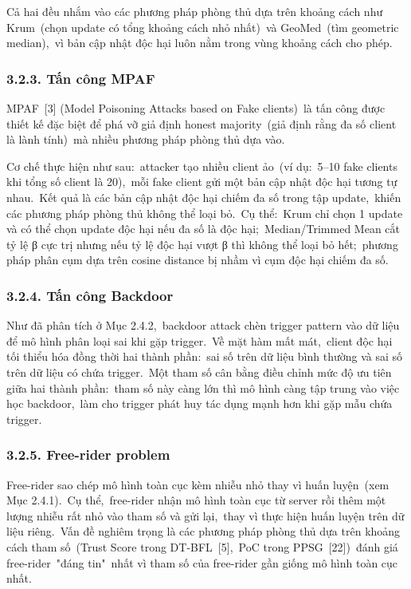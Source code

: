 Cả hai đều nhắm vào các phương pháp phòng thủ dựa trên khoảng cách như Krum~(chọn update có tổng khoảng cách nhỏ nhất)~và GeoMed~(tìm geometric median),~vì bản cập nhật độc hại luôn nằm trong vùng khoảng cách cho phép.

\subsubsection{3.2.3. Tấn công MPAF}\label{tux1ea5n-cuxf4ng-mpaf}

MPAF~{[}3{]} (Model Poisoning Attacks based on Fake clients)~là tấn công được thiết kế đặc biệt để phá vỡ giả định honest majority~(giả định rằng đa số client là lành tính)~mà nhiều phương pháp phòng thủ dựa vào.

Cơ chế thực hiện như sau:~attacker tạo nhiều client ảo~(ví dụ:~5--10 fake clients khi tổng số client là 20),~mỗi fake client gửi một bản cập nhật độc hại tương tự nhau.~Kết quả là các bản cập nhật độc hại chiếm đa số trong tập update,~khiến các phương pháp phòng thủ không thể loại bỏ.~Cụ thể:~Krum chỉ chọn 1 update và có thể chọn update độc hại nếu đa số là độc hại;~Median/Trimmed Mean cắt tỷ lệ β cực trị nhưng nếu tỷ lệ độc hại vượt β thì không thể loại bỏ hết;~phương pháp phân cụm dựa trên cosine distance bị nhầm vì cụm độc hại chiếm đa số.

\subsubsection{3.2.4. Tấn công Backdoor}\label{tux1ea5n-cuxf4ng-backdoor}

Như đã phân tích ở Mục 2.4.2,~backdoor attack chèn trigger pattern vào dữ liệu để mô hình phân loại sai khi gặp trigger.~Về mặt hàm mất mát,~client độc hại tối thiểu hóa đồng thời hai thành phần:~sai số trên dữ liệu bình thường và sai số trên dữ liệu có chứa trigger.~Một tham số cân bằng điều chỉnh mức độ ưu tiên giữa hai thành phần:~tham số này càng lớn thì mô hình càng tập trung vào việc học backdoor,~làm cho trigger phát huy tác dụng mạnh hơn khi gặp mẫu chứa trigger.

\subsubsection{3.2.5. Free-rider problem}\label{free-rider-problem}

Free-rider sao chép mô hình toàn cục kèm nhiễu nhỏ thay vì huấn luyện~(xem Mục 2.4.1).~Cụ thể,~free-rider nhận mô hình toàn cục từ server rồi thêm một lượng nhiễu rất nhỏ vào tham số và gửi lại,~thay vì thực hiện huấn luyện trên dữ liệu riêng.~Vấn đề nghiêm trọng là các phương pháp phòng thủ dựa trên khoảng cách tham số~(Trust Score trong DT-BFL~{[}5{]},~PoC trong PPSG~{[}22{]})~đánh giá free-rider~"đáng tin"~nhất vì tham số của free-rider gần giống mô hình toàn cục nhất.

